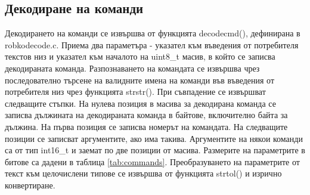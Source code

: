 \subsection{Декодиране на команди}
\label{decode_section}
Декодирането на команди се извършва от функцията decode\textunderscore cmd(), дефинирана в robko\textunderscore decode.c. Приема два параметъра - указател към въведения от потребителя текстов низ и указател към началото на uint8\_t масив, в който се записва декодираната команда. Разпознаването на командата се извършва чрез последователно търсене на валидните имена на команди във въведения от потребителя низ чрез функцията strstr(). При съвпадение се извършват следващите стъпки. На нулева позиция в масива за декодирана команда се записва дължината на декодираната команда в байтове, включително байта за дължина. На първа позиция се записва номерът на командата. На следващите позиции се записват аргументите, ако има такива. Аргументите на някои команди са от тип int16\_t и заемат по две позиции от масива. Размерите на параметрите в битове са дадени в таблица \ref{tab:commands}. Преобразуването на параметрите от текст към целочислени типове се извършва от функцията strtol() и изрично конвертиране.
